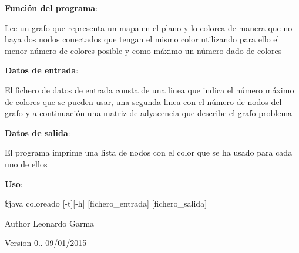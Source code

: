 {\bfseries \-Función del programa}\-: 

\-Lee un grafo que representa un mapa en el plano y lo colorea de manera que no haya dos nodos conectados que tengan el mismo color utilizando para ello el menor número de colores posible y como máximo un número dado de colores

{\bfseries \-Datos de entrada}\-: 

\-El fichero de datos de entrada consta de una linea que indica el número máximo de colores que se pueden usar, una segunda linea con el número de nodos del grafo y a continuación una matriz de adyacencia que describe el grafo problema

{\bfseries \-Datos de salida}\-: 

\-El programa imprime una lista de nodos con el color que se ha usado para cada uno de ellos

{\bfseries \-Uso}\-: 

\$java coloreado \mbox{[}-\/t\mbox{]}\mbox{[}-\/h\mbox{]} \mbox{[}fichero\-\_\-entrada\mbox{]} \mbox{[}fichero\-\_\-salida\mbox{]} 

\begin{DoxyAuthor}{\-Author}
\-Leonardo \-Garma 
\end{DoxyAuthor}
\begin{DoxyVersion}{\-Version}
0.. 09/01/2015 
\end{DoxyVersion}

